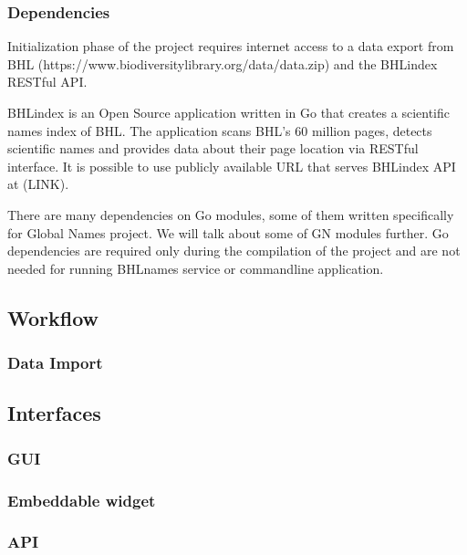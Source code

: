 \documentclass[
]{article}
\begin{document}
\hypertarget{dependencies}{%
\subsubsection{Dependencies}\label{dependencies}}

Initialization phase of the project requires internet access to a data
export from BHL (https://www.biodiversitylibrary.org/data/data.zip) and
the BHLindex RESTful API.

BHLindex is an Open Source application written in Go that creates a
scientific names index of BHL. The application scans BHL's 60 million
pages, detects scientific names and provides data about their page
location via RESTful interface. It is possible to use publicly available
URL that serves BHLindex API at (LINK).

There are many dependencies on Go modules, some of them written
specifically for Global Names project. We will talk about some of GN
modules further. Go dependencies are required only during the
compilation of the project and are not needed for running BHLnames
service or commandline application.

\hypertarget{workflow}{%
\subsection{Workflow}\label{workflow}}

\hypertarget{data-import}{%
\subsubsection{Data Import}\label{data-import}}

\hypertarget{interfaces}{%
\subsection{Interfaces}\label{interfaces}}

\hypertarget{gui}{%
\subsubsection{GUI}\label{gui}}

\hypertarget{embeddable-widget}{%
\subsubsection{Embeddable widget}\label{embeddable-widget}}

\hypertarget{api}{%
\subsubsection{API}\label{api}}
\end{document}
